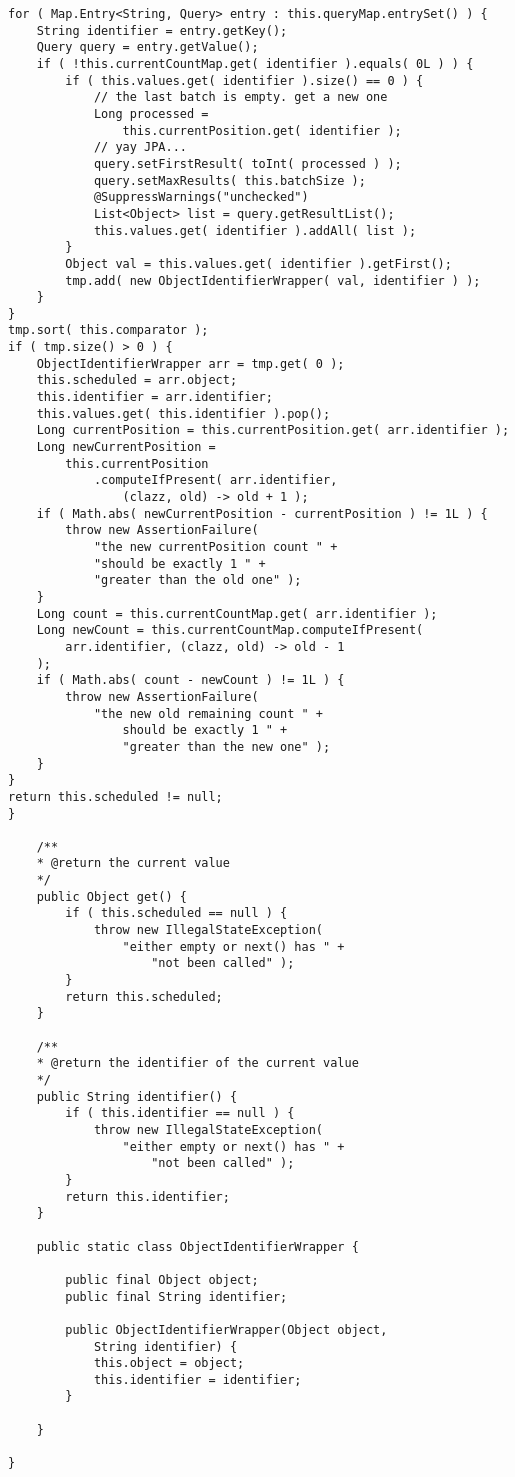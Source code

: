 \begin{lstlisting}[frame=htrbl, caption={MultiQueryAccess.java}, label={lst:MultiQueryAccess.java}]
for ( Map.Entry<String, Query> entry : this.queryMap.entrySet() ) {
	String identifier = entry.getKey();
	Query query = entry.getValue();
	if ( !this.currentCountMap.get( identifier ).equals( 0L ) ) {
		if ( this.values.get( identifier ).size() == 0 ) {
			// the last batch is empty. get a new one
			Long processed = 
				this.currentPosition.get( identifier );
			// yay JPA...
			query.setFirstResult( toInt( processed ) );
			query.setMaxResults( this.batchSize );
			@SuppressWarnings("unchecked")
			List<Object> list = query.getResultList();
			this.values.get( identifier ).addAll( list );
		}
		Object val = this.values.get( identifier ).getFirst();
		tmp.add( new ObjectIdentifierWrapper( val, identifier ) );
	}
}
tmp.sort( this.comparator );
if ( tmp.size() > 0 ) {
	ObjectIdentifierWrapper arr = tmp.get( 0 );
	this.scheduled = arr.object;
	this.identifier = arr.identifier;
	this.values.get( this.identifier ).pop();
	Long currentPosition = this.currentPosition.get( arr.identifier );
	Long newCurrentPosition = 
		this.currentPosition
			.computeIfPresent( arr.identifier, 
				(clazz, old) -> old + 1 );
	if ( Math.abs( newCurrentPosition - currentPosition ) != 1L ) {
		throw new AssertionFailure( 
			"the new currentPosition count " + 
			"should be exactly 1 " +
			"greater than the old one" );
	}
	Long count = this.currentCountMap.get( arr.identifier );
	Long newCount = this.currentCountMap.computeIfPresent(
		arr.identifier, (clazz, old) -> old - 1
	);
	if ( Math.abs( count - newCount ) != 1L ) {
		throw new AssertionFailure( 
			"the new old remaining count " + 
				should be exactly 1 " +
				"greater than the new one" );
	}
}
return this.scheduled != null;
}

	/**
	* @return the current value
	*/
	public Object get() {
		if ( this.scheduled == null ) {
			throw new IllegalStateException(
				"either empty or next() has " + 
					"not been called" );
		}
		return this.scheduled;
	}

	/**
	* @return the identifier of the current value
	*/
	public String identifier() {
		if ( this.identifier == null ) {
			throw new IllegalStateException( 
				"either empty or next() has " + 
					"not been called" );
		}
		return this.identifier;
	}

	public static class ObjectIdentifierWrapper {
	
		public final Object object;
		public final String identifier;
		
		public ObjectIdentifierWrapper(Object object,
			String identifier) {
			this.object = object;
			this.identifier = identifier;
		}
	
	}

}
\end{lstlisting}
